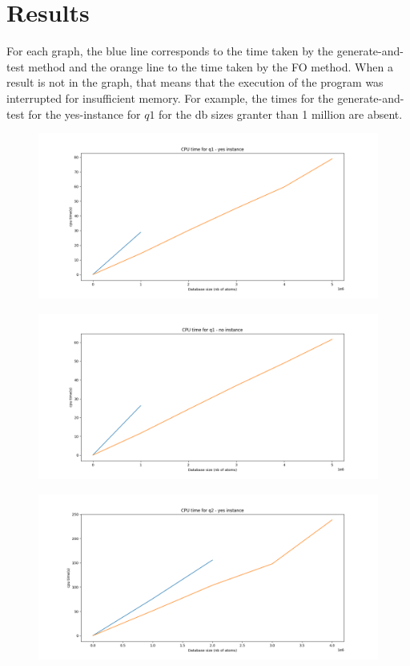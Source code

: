 
\section{Results}

For each graph, the blue line corresponds to the time taken by the generate-and-test method and the orange line to the time taken by the FO method. When a result is not in the graph, that means that the execution of the program was interrupted for insufficient memory. For example, the times for the generate-and-test for the yes-instance for $q1$ for the db sizes granter than 1 million are absent.

\begin{figure}[h]
\includegraphics[width=\textwidth]{time_q1_yesinstance.png}
\centering
\end{figure}

\begin{figure}[h]
\includegraphics[width=\textwidth]{time_q1_noinstance.png}
\centering
\end{figure}

\begin{figure}[h]
\includegraphics[width=\textwidth]{time_q2_yesinstance.png}
\centering
\end{figure}

